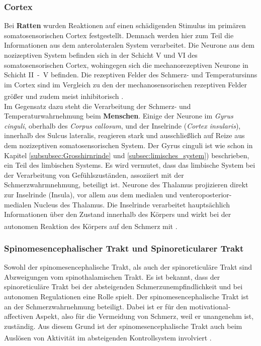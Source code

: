 \documentclass[12pt,a4paper,pdftex]{article}
\begin{document}
\subsubsection*{Cortex}
Bei \textbf{Ratten} wurden Reaktionen auf einen schädigenden Stimulus im primären somatosensorischen Cortex festgestellt. Demnach werden hier zum Teil die Informationen aus dem anterolateralen System verarbeitet. Die Neurone aus dem nozizeptiven System befinden sich in der Schicht V und VI des somatosensorischen Cortex, wohingegen sich die mechanorezeptiven Neurone in Schicht II~-~V befinden. Die rezeptiven Felder des Schmerz- und Temperatursinns im Cortex sind im Vergleich zu den der mechanosensorischen rezeptiven Felder größer und zudem meist inhibitorisch \textsuperscript{\cite[25]{paxinos2014rat}}.
\\
\noindent Im Gegensatz dazu steht die Verarbeitung der Schmerz- und  Temperaturwahrnehmung beim \textbf{Menschen}. Einige der Neurone im \textit{Gyrus cinguli}, oberhalb des \textit{Corpus callosum}, und der Inselrinde (\textit{Cortex insularis}), innerhalb des Sulcus lateralis, reagieren stark und ausschließlich auf Reize aus dem nozizeptiven somatosensorischen System. Der Gyrus cinguli ist wie schon in Kapitel \ref{subsubsec:Grosshirnrinde} und \ref{subsec:limisches_system}) beschrieben, ein Teil des limbischen Systems. Es wird vermutet, dass das limbische System bei der Verarbeitung von Gefühlszuständen, assoziiert mit der Schmerzwahrmnehmung, beteiligt ist. Neurone des Thalamus projizieren direkt zur Inselrinde (Insula), vor allem aus dem medialen und venteroposterior-medialen Nucleus des Thalamus. Die Inselrinde verarbeitet hauptsächlich Informationen über den Zustand innerhalb des Körpers und wirkt bei der autonomen Reaktion des Körpers auf den Schmerz mit \textsuperscript{\cite[24]{kandel2013principles}}.

\subsubsection*{Spinomesencephalischer Trakt und  Spinoreticularer Trakt}

Sowohl der spinomesencephalische Trakt, als auch der spinoreticuläre Trakt sind Abzweigungen vom spinothalamischen Trakt. Es ist bekannt, dass der spinoreticuläre Trakt bei der absteigenden Schmerzunempfindlichkeit und bei autonomen Regulationen eine Rolle spielt. Der spinomesencephalische Trakt ist an der Schmerzwahrnehmung beteiligt. Dabei ist er für den motivational-affectiven Aspekt, also für die Vermeidung von Schmerz, weil er unangenehm ist, zuständig. Aus diesem Grund ist der spinomesencephalische Trakt auch beim Auslösen von Aktivität im absteigenden Kontrollsystem involviert \textsuperscript{\cite[24]{kandel2013principles}}.
\end{document}
